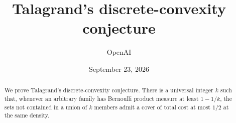 \documentclass[11pt,letterpaper]{article}
\title{Talagrand's discrete-convexity conjecture}
\author{OpenAI}
\date{September 23, 2026}
\theoremstyle{definition}
\theoremstyle{remark}
\numberwithin{equation}{section}
\begin{document}
\maketitle
\begin{abstract}
We prove Talagrand's discrete-convexity conjecture.
There is a universal integer $k$ such that, whenever an arbitrary family has
Bernoulli product measure at least $1-1/k$, the sets not contained
in a union of $k$ members admit a cover of total cost at most $1/2$
at the same density.
\end{abstract}






\end{document}
